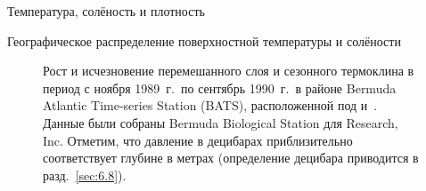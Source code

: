 \begin{chapter}{Температура, солёность и плотность}
\begin{section}{Географическое распределение поверхностной температуры и солёности}
\begin{figure}[t!]
\caption{Рост и исчезновение перемешанного слоя и сезонного термоклина
в период с ноября 1989~г.\ по сентябрь 1990~г.\ в районе
Bermuda Atlantic Time-series Station (BATS), расположенной под
 и~. Данные были собраны 
Bermuda Biological Station для Research, Inc. Отметим, что давление 
в децибарах приблизительно соответствует глубине в метрах 
(определение децибара приводится в разд.~\ref{sec:6.8}).}
\label{fig:seasonalthermo}
\end{figure}
% 


\end{section}
\end{chapter}

